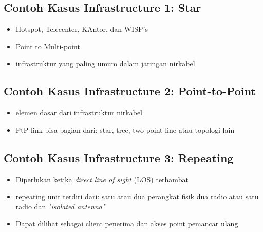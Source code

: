\documentclass[a4paper,12pt]{article}
\begin{document}
\subsection{Contoh Kasus Infrastructure 1: Star}
\begin{itemize}
    \item Hotspot, Telecenter, KAntor, dan WISP's
    \item Point to Multi-point
    \item infrastruktur yang paling umum dalam jaringan nirkabel
\end{itemize}

\subsection{Contoh Kasus Infrastructure 2: Point-to-Point}
\begin{itemize}
    \item elemen dasar dari infrastruktur nirkabel 
    \item PtP link bisa bagian dari:
        \subitem star, tree, two point line atau topologi lain
\end{itemize}

\subsection{Contoh Kasus Infrastructure 3: Repeating}
\begin{itemize}
    \item Diperlukan ketika \textit{direct line of sight} (LOS) terhambat 
    \item repeating unit terdiri dari:
        \subitem satu atau dua perangkat fisik
        \subitem dua radio atau satu radio dan \textit{"isolated antenna"}
    \item Dapat dilihat sebagai client penerima dan akses point pemancar ulang
\end{itemize}
\end{document}
